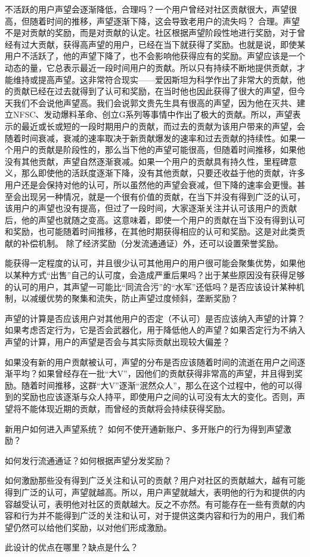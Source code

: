 \documentclass[11pt]{article}
\begin{document}
不活跃的用户声望会逐渐降低，合理吗？一个用户曾经对社区贡献很大，声望很高，但随着时间的推移，声望逐渐下降，这会导致老用户的流失吗？  
合理。声望不是对贡献的奖励，而是对贡献的认定。社区根据声望阶段性地进行奖励，对于曾经有过大贡献，获得高声望的用户，已经在当下就获得了奖励。也就是说，即使某用户不活跃了，他的声望下降了，也不会影响他获得应有的奖励。声望应该是一个动态的量，它总表示最近一段时间用户的贡献。所以只有持续不断地提供贡献，才能维持或提高声望。这非常符合现实——爱因斯坦为科学作出了非常大的贡献，他的贡献已经在过去就得到了认可和奖励，在当时他也因此获得了很大的声望，但今天我们不会说他声望高。我们会说郭文贵先生具有很高的声望，因为他在灭共、建立NFSC、发动爆料革命、创立G系列等事情中作出了极大的贡献。所以，声望表示的最近或长或短的一段时期用户的贡献，而过去的贡献为该用户带来的声望，会随着时间衰减，衰减的速率取决于新贡献爆发的速率和过去贡献的持续性。如果一个用户的贡献是阶段性的，那么当下他的声望可能很高，但随着时间推移，如果他没有其他贡献，声望自然逐渐衰减。如果一个用户的贡献具有持久性，里程碑意义，那么即使他的活跃度逐渐下降，没有其他贡献，只要还收益于他的贡献，许多用户还是会保持对他的认可，所以虽然他的声望会衰减，但下降的速率会更慢。甚至会出现另一种情况，就是一个很有价值的贡献，在当下并没有得到广泛的认可，该用户的声望也没有提高，但过了一段时间，大家逐渐关注并认可该用户的贡献后，他的声望也就随之变高。这意味着，即使一个用户的贡献在当下没有得到认可和奖励，也可能随着时间推移，在其他时期获得相应的认可和奖励。这是对此类贡献的补偿机制。  
除了经济奖励（分发流通通证）外，还可以设置荣誉奖励。  

能获得一定程度的认可，并且很少认可其他用户的用户很可能会聚集优势，如果他以某种方式“出售”自己的认可度，会造成严重后果吗？出于某些原因没有获得足够的认可的用户，其声望一可能比“同流合污”的“水军”还低吗？是否应该设计某种机制，以减缓优势的聚集和流失，防止声望过度倾斜，垄断奖励？  

声望的计算是否应该用户对其他用户的否定（不认可）是否应该纳入声望的计算？如果考虑否定行为，它是否会武器化，用于降低他人的声望？如果否定行为不纳入声望的计算，用户的声望是否会与其实际贡献出现较大偏差？  

如果没有新的用户贡献被认可，声望的分布是否应该随着时间的流逝在用户之间逐渐平均？如果曾经存在一批“大V”，因他们的贡献获得非常高的声望，并且得到奖励。随着时间推移，这群“大V”逐渐“泯然众人”，那么在这个过程中，他的可以得到的奖励也应该逐渐与众人持平，即使用户之间的认可没有太大的变化。否则，声望将不能体现近期的贡献，而曾经的贡献将会持续获得奖励。  

新用户如何进入声望系统？  
如何不使开通新账户、多开账户的行为得到声望激励？  

如何发行流通通证？如何根据声望分发奖励？  

如何激励那些没有得到广泛关注和认可的贡献？用户对社区的贡献越大，越有可能得到广泛的认可，声望就越高。所以，用户声望就越大，表明他的行为和提供的内容越受认可，表明他对社区的贡献越大。反之不亦然。有可能存在一些有贡献的内容和行为并不能得到广泛的关注和认可，对于提供这类内容和行为的用户，我们希望仍然可以给他们奖励，以对他们形成激励。  

此设计的优点在哪里？缺点是什么？  
\end{document}
